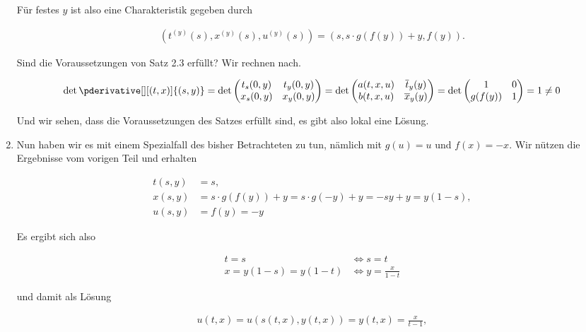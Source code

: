 \begin{solution}
\begin{enumerate}[label = (\roman*)]
	Für festes $y$ ist also eine Charakteristik gegeben durch
	
	\begin{align*}
		(t^{(y)}(s), x^{(y)}(s), u^{(y)}(s))
		=
		(s, s \cdot g(f(y)) + y, f(y)).
	\end{align*}

	Sind die Voraussetzungen von Satz 2.3 erfüllt? Wir rechnen nach.

	\begin{align*}
		\det \pderivative[][(t,x)]{(s,y)} = \det
		\begin{pmatrix}
			t_s(0,y) & t_y(0,y) \\
			x_s(0,y) & x_y(0,y)
		\end{pmatrix} 
		=
		\det
		\begin{pmatrix}
			a(t, x, u) & \overline{t}_y(y) \\
			b(t, x, u) & \overline{x}_y(y)
		\end{pmatrix} 
		=
		\det
		\begin{pmatrix}
			1 & 0 \\
			g(f(y)) & 1
		\end{pmatrix} 
		= 1 \neq 0
	\end{align*}

	Und wir sehen, dass die Voraussetzungen des Satzes erfüllt sind, es gibt also lokal eine Lösung.
	
	\item Nun haben wir es mit einem Spezialfall des bisher Betrachteten zu tun, nämlich mit $g(u) = u$ und $f(x) = -x$. Wir nützen die Ergebnisse vom vorigen Teil und erhalten 
	
	\begin{align*}
		t(s,y) & = s, \\
		x(s,y) & = s \cdot g(f(y)) + y = s \cdot g(-y) + y = -sy + y = y(1 - s), \\
		u(s,y) & = f(y) = -y
	\end{align*}

	Es ergibt sich also

	\begin{align*}
		t = s
		& \iff
		s = t \\
		x = y(1 - s) = y(1 - t)
		& \iff
		y = \frac{x}{1 - t}
	\end{align*}
	
	und damit als Lösung
	
	\begin{align*}
		u(t,x) = u(s(t,x), y(t,x)) = y(t,x) = \frac{x}{t - 1}, 
	\end{align*}
	

\end{enumerate}
\end{solution}
